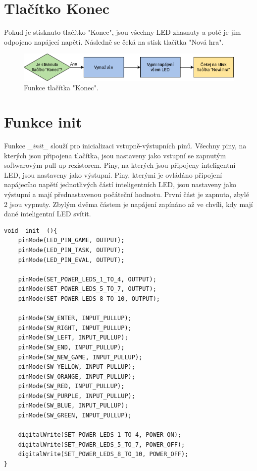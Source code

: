   \section{Tlačítko Konec}
  Pokud je stisknuto tlačítko "Konec", jsou všechny LED zhasnuty a poté je jim odpojeno napájecí napětí. Následně se čeká na stisk tlačítka
  "Nová hra". 

  \begin{figure}[!h]
    \begin{center}
      \includegraphics[scale=0.6]{obrazky/Konec.png}
    \end{center}
    \caption[Funkce tlačítka Konec]{Funkce tlačítka "Konec".}
  \end{figure}

\iffalse
\section{Funkce init}
Funkce {\it \_init\_} slouží pro inicializaci vstupně-výstupních pinů. Všechny piny, na kterých jsou připojena tlačítka, jsou nastaveny jako 
vstupní se zapnutým softwarovým pull-up rezistorem. Piny, na kterých jsou připojeny inteligentní LED, jsou nastaveny jako výstupní. Piny,
kterými je ovládáno připojení napájecího napětí jednotlivých částí inteligentních LED, jsou nastaveny jako výstupní a mají přednastavenou 
počáteční hodnotu. První část je zapnuta, zbylé 2 jsou vypnuty. Zbylým dvěma částem je napájení zapínáno až ve chvíli, kdy mají dané 
inteligentní LED svítit.

\begin{minipage}{\linewidth}
\begin{lstlisting}[frame=single,numbers=right,caption={Funkce pro úvodní inicializaci hardwaru.},label=lst:priklad.vypis.kodu.C,basicstyle=\ttfamily\small, keywordstyle=\color{black}\bfseries\underbar,]
void _init_ (){
    pinMode(LED_PIN_GAME, OUTPUT);
    pinMode(LED_PIN_TASK, OUTPUT);
    pinMode(LED_PIN_EVAL, OUTPUT);

    pinMode(SET_POWER_LEDS_1_TO_4, OUTPUT);
    pinMode(SET_POWER_LEDS_5_TO_7, OUTPUT);
    pinMode(SET_POWER_LEDS_8_TO_10, OUTPUT);

    pinMode(SW_ENTER, INPUT_PULLUP);
    pinMode(SW_RIGHT, INPUT_PULLUP);
    pinMode(SW_LEFT, INPUT_PULLUP);
    pinMode(SW_END, INPUT_PULLUP);
    pinMode(SW_NEW_GAME, INPUT_PULLUP);
    pinMode(SW_YELLOW, INPUT_PULLUP);
    pinMode(SW_ORANGE, INPUT_PULLUP);
    pinMode(SW_RED, INPUT_PULLUP);
    pinMode(SW_PURPLE, INPUT_PULLUP);
    pinMode(SW_BLUE, INPUT_PULLUP);
    pinMode(SW_GREEN, INPUT_PULLUP);

    digitalWrite(SET_POWER_LEDS_1_TO_4, POWER_ON); 
    digitalWrite(SET_POWER_LEDS_5_TO_7, POWER_OFF);
    digitalWrite(SET_POWER_LEDS_8_TO_10, POWER_OFF);
}
    \end{lstlisting}
    \end{minipage}

